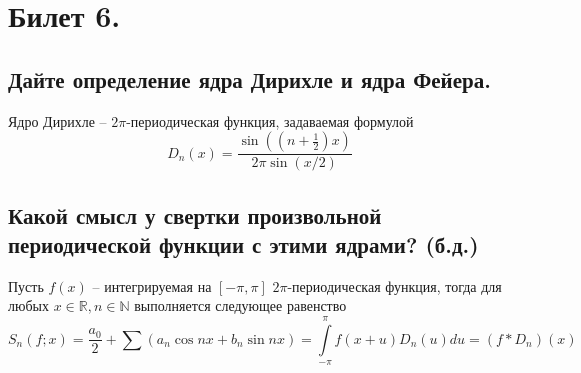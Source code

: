 \section{Билет 6.}

\subsection{Дайте определение ядра Дирихле и ядра Фейера.}
\begin{definition}
    Ядро Дирихле -- $2\pi$-периодическая функция, задаваемая формулой
    \[
        D_n(x) = \frac{\sin \left((n + \frac{1}{2})x\right) }{2\pi \sin (x/2)}
    \]
\end{definition}

\subsection{Какой смысл у свертки произвольной периодической функции с этими ядрами? (б.д.)}
\begin{statement}
    Пусть $f(x)$ -- интегрируемая на $[-\pi, \pi]$ $2\pi$-периодическая функция, тогда для любых $x \in \mathbb{R}, n \in \mathbb{N}$ выполняется следующее равенство
    \[
        S_n(f; x) = \frac{a_0}{2} + \sum (a_n \cos nx + b_n \sin nx) = \int \limits_{-\pi}^{\pi} f(x + u) D_n(u) du = (f * D_n)(x)
    \]
\end{statement}